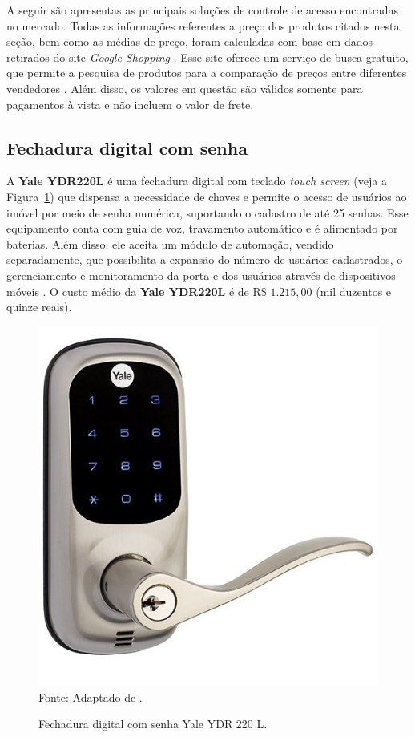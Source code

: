 A seguir são apresentas as principais soluções de controle de acesso encontradas no mercado. Todas as informações referentes a preço dos produtos citados nesta seção, bem como as médias de preço, foram calculadas com base em dados retirados do site \textit{Google Shopping} \cite{googleshopping}. Esse site oferece um serviço de busca gratuito, que permite a pesquisa de produtos para a comparação de preços entre diferentes vendedores \cite{sfetcu2014google, coombs2008google}. Além disso, os valores em questão são válidos somente para pagamentos à vista e não incluem o valor de frete.


 \subsection{Fechadura digital com senha}

 A \textbf{Yale YDR220L} é uma fechadura digital com teclado \textit{touch screen} (veja a Figura~\ref{yalerealliving}) que dispensa a necessidade de chaves e permite o acesso de usuários ao imóvel por meio de senha numérica, suportando o cadastro de até 25 senhas. Esse equipamento conta com guia de voz, travamento automático e é alimentado por baterias. Além disso, ele aceita um módulo de automação, vendido separadamente, que possibilita a expansão do número de usuários cadastrados, o gerenciamento e monitoramento da porta e dos usuários através de dispositivos móveis \cite{yalerealliving}. O custo médio da \textbf{Yale YDR220L} é de R\$ $1.215,00$ (mil duzentos e quinze reais).

  \begin{figure}[!ht]
  \begin{center}
  \caption{Fechadura digital com senha Yale YDR 220 L.}
  \includegraphics[scale=0.5]{figuras/cap3/yalerealliving.jpg}\\
  Fonte: Adaptado de \cite{yalerealliving}.
  \label{yalerealliving}
  \end{center}
  \end{figure}


